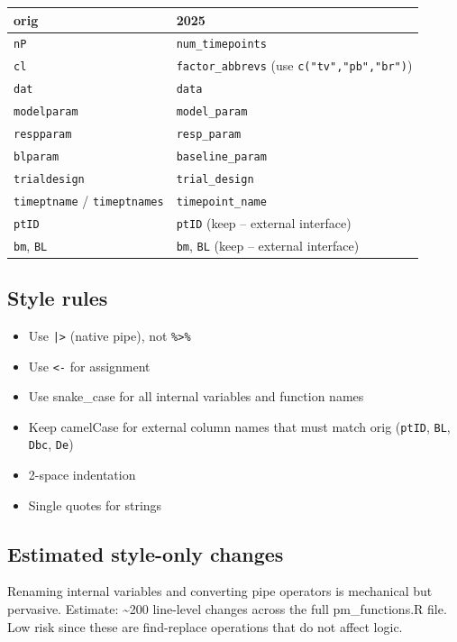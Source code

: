 \documentclass[11pt]{article}
\begin{document}
\begin{table}[h]
\centering
\begin{tabular}{ll}
\toprule
orig & 2025 \\
\midrule
\texttt{nP} & \texttt{num\_timepoints} \\
\texttt{cl} & \texttt{factor\_abbrevs} (use \texttt{c("tv","pb","br")}) \\
\texttt{dat} & \texttt{data} \\
\texttt{modelparam} & \texttt{model\_param} \\
\texttt{respparam} & \texttt{resp\_param} \\
\texttt{blparam} & \texttt{baseline\_param} \\
\texttt{trialdesign} & \texttt{trial\_design} \\
\texttt{timeptname} / \texttt{timeptnames} & \texttt{timepoint\_name} \\
\texttt{ptID} & \texttt{ptID} (keep -- external interface) \\
\texttt{bm}, \texttt{BL} & \texttt{bm}, \texttt{BL} (keep -- external interface) \\
\bottomrule
\end{tabular}
\end{table}

\subsection{Style rules}

\begin{itemize}
  \item Use \texttt{|>} (native pipe), not \texttt{\%>\%}
  \item Use \texttt{<-} for assignment
  \item Use snake\_case for all internal variables and function names
  \item Keep camelCase for external column names that must match orig
    (\texttt{ptID}, \texttt{BL}, \texttt{Dbc}, \texttt{De})
  \item 2-space indentation
  \item Single quotes for strings
\end{itemize}

\subsection{Estimated style-only changes}

Renaming internal variables and converting pipe operators is
mechanical but pervasive. Estimate: \textasciitilde 200 line-level changes across
the full pm\_functions.R file. Low risk since these are find-replace
operations that do not affect logic.
\end{document}
